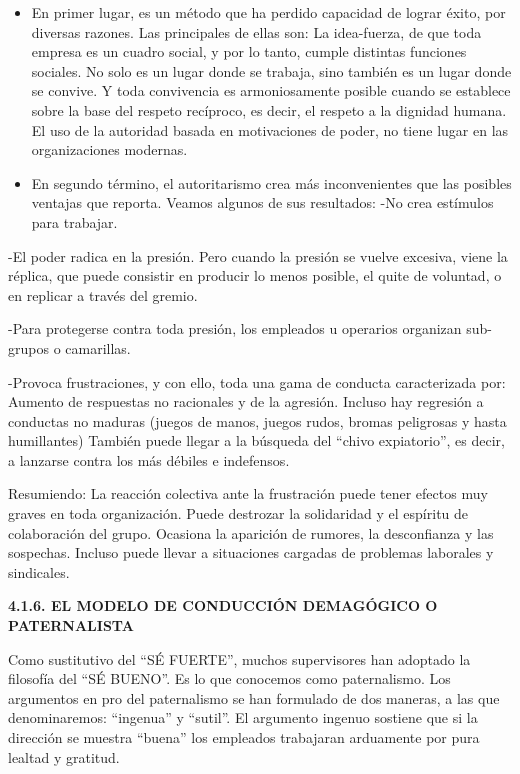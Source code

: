 \begin{itemize}
  \item En primer lugar, es un método que ha perdido capacidad de lograr éxito, por diversas razones. Las principales de ellas son: La idea-fuerza, de que toda empresa es un cuadro social, y por lo tanto, cumple distintas funciones sociales. No solo es un lugar donde se trabaja, sino también es un lugar donde se convive. Y toda convivencia es armoniosamente posible cuando se establece sobre la base del respeto recíproco, es decir, el respeto a la dignidad humana. El uso de la autoridad basada en motivaciones de poder, no tiene lugar en las organizaciones modernas.
  \item En segundo término, el autoritarismo crea más inconvenientes que las posibles ventajas que reporta. Veamos algunos de sus resultados: -No crea estímulos para trabajar.
\end{itemize}
-El poder radica en la presión. Pero cuando la presión se vuelve excesiva, viene la réplica, que puede consistir en producir lo menos posible, el quite de voluntad, o en replicar a través del gremio.

-Para protegerse contra toda presión, los empleados u operarios organizan sub- grupos o camarillas.

-Provoca frustraciones, y con ello, toda una gama de conducta caracterizada por: Aumento de respuestas no racionales y de la agresión. Incluso hay regresión a conductas no maduras (juegos de manos, juegos rudos, bromas peligrosas y hasta humillantes) También puede llegar a la búsqueda del “chivo expiatorio”, es decir, a lanzarse contra los más débiles e indefensos.

Resumiendo: La reacción colectiva ante la frustración puede tener efectos muy graves en toda organización. Puede destrozar la solidaridad y el espíritu de colaboración del grupo. Ocasiona la aparición de rumores, la desconfianza y las sospechas. Incluso puede llevar a situaciones cargadas de problemas laborales y sindicales.

\textbf{4.1.6. EL MODELO DE CONDUCCIÓN DEMAGÓGICO O PATERNALISTA}

Como sustitutivo del “SÉ FUERTE”, muchos supervisores han adoptado la filosofía del “SÉ BUENO”. Es lo que conocemos como paternalismo. Los argumentos en pro del paternalismo se han formulado de dos maneras, a las que denominaremos: “ingenua” y “sutil”. El argumento ingenuo sostiene que si la dirección se muestra “buena” los empleados trabajaran arduamente por pura lealtad y gratitud.


